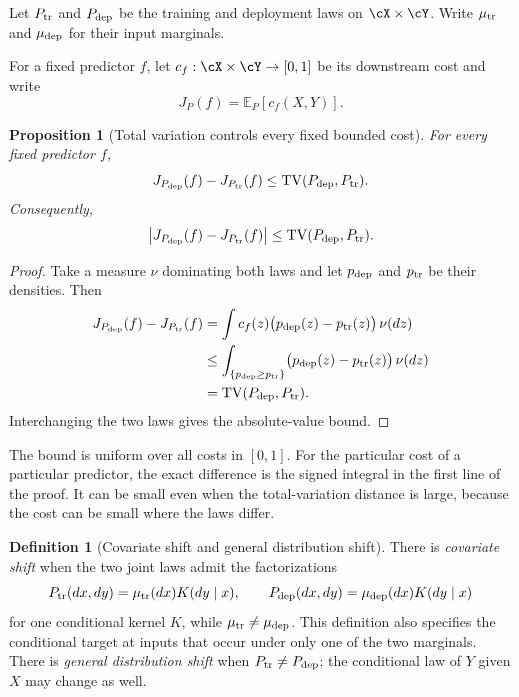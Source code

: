 \documentclass[11pt,twoside]{article}
\newcommand{\E}{\mathbb E}
\newcommand{\TV}{\mathrm{TV}}
\newtheorem{proposition}[theorem]{Proposition}
\theoremstyle{definition}
\newtheorem{definition}[theorem]{Definition}
\theoremstyle{remark}
\begin{document}
Let $P_{\rm tr}$ and $P_{\rm dep}$ be the training and deployment laws on
$\cX\times\cY$. Write $\mu_{\rm tr}$ and $\mu_{\rm dep}$ for their input
marginals.

For a fixed predictor $f$, let $c_f:\cX\times\cY\to[0,1]$ be its downstream
cost and write
\[
 J_P(f)=\E_P[c_f(X,Y)].
\]

\begin{proposition}[Total variation controls every fixed bounded cost]
\label{prop:tv-fixed-cost}
For every fixed predictor $f$,
\begin{equation}
 J_{P_{\rm dep}}(f)-J_{P_{\rm tr}}(f)
 \le \TV(P_{\rm dep},P_{\rm tr}).
\label{eq:tv-fixed-cost-one-sided}
\end{equation}
Consequently,
\begin{equation}
 \left|J_{P_{\rm dep}}(f)-J_{P_{\rm tr}}(f)\right|
 \le \TV(P_{\rm dep},P_{\rm tr}).
\label{eq:tv-fixed-cost}
\end{equation}
\end{proposition}

\begin{proof}
Take a measure $\nu$ dominating both laws and let $p_{\rm dep}$ and
$p_{\rm tr}$ be their densities. Then
\begin{align*}
J_{P_{\rm dep}}(f)-J_{P_{\rm tr}}(f)
&=\int c_f(z)\bigl(p_{\rm dep}(z)-p_{\rm tr}(z)\bigr)\,\nu(dz)\\
&\le \int_{\{p_{\rm dep}\ge p_{\rm tr}\}}
       \bigl(p_{\rm dep}(z)-p_{\rm tr}(z)\bigr)\,\nu(dz)\\
&=\TV(P_{\rm dep},P_{\rm tr}).
\end{align*}
Interchanging the two laws gives the absolute-value bound.
\end{proof}

The bound is uniform over all costs in $[0,1]$. For the particular cost of a
particular predictor, the exact difference is the signed integral in the first
line of the proof. It can be small even when the total-variation distance is
large, because the cost can be small where the laws differ.

\begin{definition}[Covariate shift and general distribution shift]
There is \emph{covariate shift} when the two joint laws admit the
factorizations
\begin{equation}
 P_{\rm tr}(dx,dy)=\mu_{\rm tr}(dx)K(dy\mid x),
 \qquad
 P_{\rm dep}(dx,dy)=\mu_{\rm dep}(dx)K(dy\mid x)
 \label{eq:covariate-shift}
\end{equation}
for one conditional kernel $K$, while $\mu_{\rm tr}\ne\mu_{\rm dep}$.
This definition also specifies the conditional target at inputs that occur
under only one of the two marginals. There is \emph{general distribution shift}
when $P_{\rm tr}\ne P_{\rm dep}$; the conditional law of $Y$ given $X$ may
change as well.
\end{definition}
\end{document}
